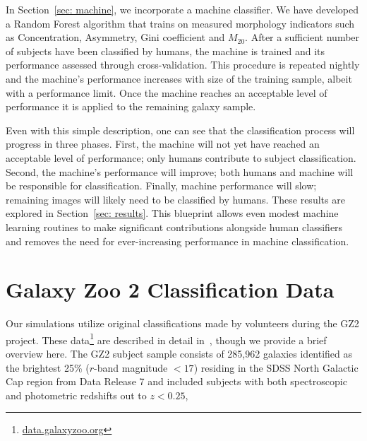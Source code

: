 \documentclass[twocolumn]{aastex6}
\newcommand{\M}[1]{$M_{\mathrm{#1}}$}
\begin{document}
In Section~\ref{sec: machine}, we incorporate a machine classifier. We have 
developed a Random Forest algorithm that trains on measured morphology
indicators such as Concentration, Asymmetry, Gini coefficient and \M{20}. 
After a sufficient number of subjects have been classified by humans, 
 the machine is trained and its performance assessed through cross-validation. 
This procedure is repeated nightly and the machine's performance increases with
size of the training sample, albeit with a performance limit. 
Once the machine reaches an acceptable level of 
performance it is applied to the remaining galaxy sample. 

Even with this simple description, one can see that the classification process 
will progress in three phases.  First, the machine will not yet have reached an 
acceptable level of performance; only humans contribute to subject classification.
Second, the machine's performance will improve; both humans and machine 
will be responsible for classification. Finally, machine performance 
will slow; remaining images will likely need to be classified by humans. 
These results are explored in  Section~\ref{sec: results}. 
This blueprint allows even modest machine learning 
routines to make significant contributions alongside human classifiers and 
removes the need for ever-increasing performance in machine classification.



\section{Galaxy Zoo 2 Classification Data} \label{sec: data}

Our simulations utilize original classifications made by volunteers during the GZ2 project. 
These data\footnote{\url{data.galaxyzoo.org}} are described in detail in~\cite{Willett2013}, 
though we provide a brief overview here.  
The GZ2 subject sample consists of 285,962 galaxies identified as the
 brightest 25\% ($r$-band magnitude $< 17$) residing in the SDSS North Galactic 
Cap region from Data Release 7 and included subjects with both spectroscopic and 
photometric redshifts out to $z < 0.25$,
\end{document}
